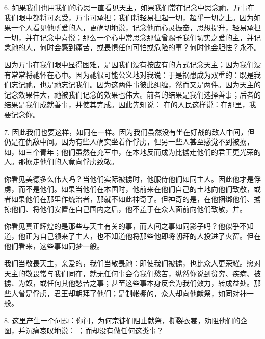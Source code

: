 6. 如果我们也用我们的心思一直看见天主，如果我们常在记念中思念祂，万事在我们眼中都将可忍受，万事可承担；我们将轻易担起一切，超乎一切之上。因为如果一个人看见他所爱的人，更确切地说，记念他而心灵振奋，思想提升，轻易承担一切，并在记念中喜悦；那么一个心中常思念那位曾赐予我们切实之爱的主，并记念祂的人，何时会感到痛苦，或畏惧任何可怕或危险的事？何时他会胆怯？永不。\par

因为万事在我们眼中显得困难，是因我们没有按应有的方式记念天主；因为我们没有常常将祂怀在心中。因为祂很可能公义地对我说：于是祸患成为双重的：既是我们忘记祂，也是祂忘记我们。因为这两件事彼此纠缠，然而又是两件。因为天主的记念效果伟大，祂被我们记念的效果也伟大。前者的结果是我们选择善事；后者的结果是我们成就善事，并使其完成。因此先知说： 在的人民这样说：在那里，我要记念你。\par

7. 因此我们也要这样，如同在一样。因为我们虽然没有坐在好战的敌人中间，但仍是在仇敌中间。因为有些人确实坐着作俘虏，但另一些人甚至感觉不到被掳，如，如三个青年；他们虽然在充军中，在本地反而成为比掳走他们的君王更光荣的人。那掳走他们的人竟向俘虏致敬。\par

你看见美德多么伟大吗？当他们实际被掳时，他服侍他们如同主人。因此他才是俘虏，而不是他们。如果当他们在本国时，他前来在他们自己的土地向他们致敬，或者如果他们在那里作统治者，那就不如此神奇了。但神奇的是，在他捆绑他们、掳掠他们、将他们安置在自己国内之后，他不羞于在众人面前向他们致敬，并。\par

你看见真正辉煌的是那些与天主有关的事，而人间之事如同影子吗？他似乎不知道，他正为自己领来了主人，也不知道他将那些他即将朝拜的人投进了火窑。但在他们看来，这些事如同梦一般。\par

我们当敬畏天主，亲爱的，我们当敬畏祂：即使我们被掳，也比众人更荣耀。愿对天主的敬畏常与我们同在，就无任何事会令我们愁苦，纵然你说到贫穷、疾病、被掳、为奴，或任何其他愁苦之事；甚至这些事本身反会为我们效力，转成益处。那些人曾是俘虏，君王却朝拜了他们；是制帐棚的，众人却向他献祭，如同对神一般。\par

8. 这里产生一个问题：你问，为何宗徒们阻止献祭，撕裂衣裳，劝阻他们的企图，并沉痛哀叹地说： ；而却没有做任何这类事？\par


